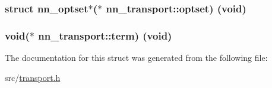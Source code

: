 \subsubsection[{optset}]{\setlength{\rightskip}{0pt plus 5cm}struct {\bf nn\+\_\+optset}$\ast$($\ast$ nn\+\_\+transport\+::optset) (void)}\hypertarget{structnn__transport_a44552f61e9236e7987e3c921361c76a8}{}\label{structnn__transport_a44552f61e9236e7987e3c921361c76a8}
\subsubsection[{term}]{\setlength{\rightskip}{0pt plus 5cm}void($\ast$ nn\+\_\+transport\+::term) (void)}\hypertarget{structnn__transport_a3a61c62241f41d01ad4d0c165462b8b5}{}\label{structnn__transport_a3a61c62241f41d01ad4d0c165462b8b5}


The documentation for this struct was generated from the following file\+:\begin{DoxyCompactItemize}
\item 
src/\hyperlink{transport_8h}{transport.\+h}\end{DoxyCompactItemize}
